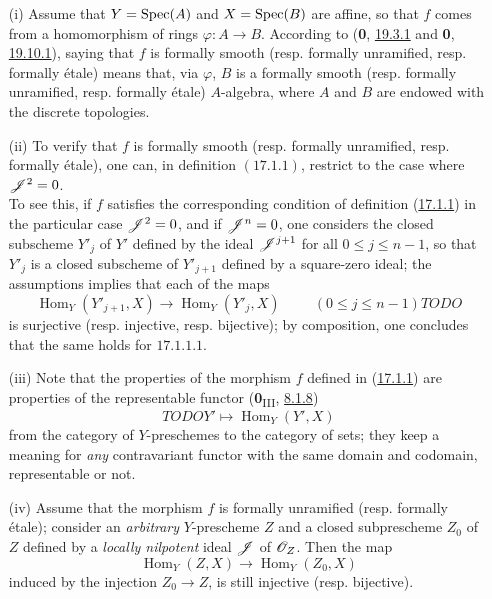 \begin{remark}[17.1.2]
\label{IV.17.1.2}
\begin{enumerate}
	\item[(i)] Assume that $Y = {\mathop{\mathrm{Spec}}\nolimits}(A)$ and $X = {\mathop{\mathrm{Spec}}\nolimits}(B)$ are affine, so that $f$ comes from a homomorphism of rings $\varphi: A \to B$. According to (\textbf{0}, \hyperref[0.19.3.1]{19.3.1} and \textbf{0}, \hyperref[0.19.10.1]{19.10.1}), saying that $f$ is formally smooth (resp. formally unramified, resp. formally \'etale) means that, via $\varphi$, $B$ is a formally smooth (resp. formally unramified, resp. formally \'etale) $A$-algebra, where $A$ and $B$ are endowed with the discrete topologies.
	\item[(ii)] To verify that $f$ is formally smooth (resp. formally unramified, resp. formally \'etale), one can, in definition $(\hyperref[IV.17.1.1]{17.1.1})$, restrict to the case where $\mathscr{J}^2 = 0$.\\
To see this, if $f$ satisfies the corresponding condition of definition (\hyperref[IV.17.1.1]{17.1.1}) in the particular case $\mathscr{J}^2 = 0$, and if $\mathscr{J}^n = 0$, one considers the closed subscheme $Y'_j$ of $Y'$ defined by the ideal $\mathscr{J}^{j+1}$ for all $0\leq j \leq n-1$, so that $Y'_j$ is a closed subscheme of $Y'_{j+1}$ defined by a square-zero ideal; the assumptions implies that each of the maps
\[
	\operatorname{Hom}_Y(Y'_{j+1}, X) \to \operatorname{Hom}_Y(Y'_j, X) \hspace{1cm} (0 \leq j \leq n-1) TODO
\] is surjective (resp. injective, resp. bijective); by composition, one concludes that the same holds for $\hyperref[IV.17.1.1.1]{17.1.1.1}$.
\item[(iii)] Note that the properties of the morphism $f$ defined in (\hyperref[IV.17.1.1]{17.1.1}) are properties of the representable functor (\textbf{0}\textsubscript{III}, \hyperref[0.8.1.8]{8.1.8})
\[
  TODO Y' \mapsto \operatorname{Hom}_Y(Y', X) 
\] from the category of $Y$-preschemes to the category of sets; they keep a meaning for \emph{any} contravariant functor with the same domain and codomain, representable or not.
\item[(iv)] Assume that the morphism $f$ is formally unramified (resp. formally \'etale); consider an \emph{arbitrary} $Y$-prescheme $Z$ and a closed subprescheme $Z_0$ of $Z$ defined by a \emph{locally nilpotent} ideal $\mathscr{J}$ of $\mathscr{O}_Z$. Then the map
\[
\label{IV.17.1.2.1}	
		\operatorname{Hom}_Y(Z, X) \to \operatorname{Hom}_Y(Z_0, X)
\tag{17.1.2.1}
		\] induced by the injection $Z_0 \to Z$, is still injective (resp. bijective).

\end{enumerate}
\end{remark}
